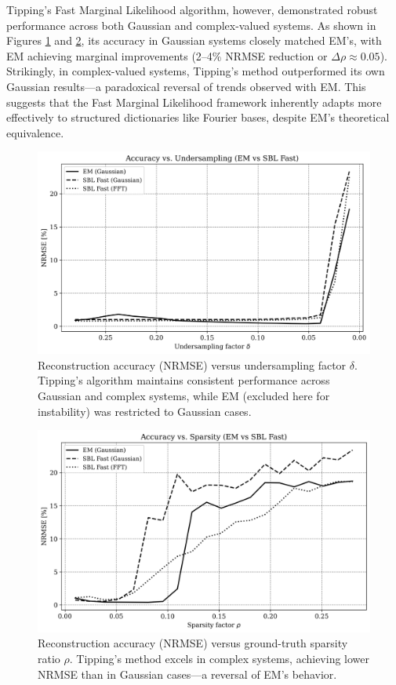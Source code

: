 \documentclass{article}
\begin{document}
Tipping’s Fast Marginal Likelihood algorithm, however, demonstrated robust performance across both Gaussian and complex-valued systems. As shown in Figures \ref{fig:accuracy_vs_undersampling_EMSB} and \ref{fig:accuracy_vs_sparsity_EMSB}, its accuracy in Gaussian systems closely matched EM’s, with EM achieving marginal improvements (2–4\% NRMSE reduction or $\Delta\rho\approx 0.05$). Strikingly, in complex-valued systems, Tipping’s method outperformed its own Gaussian results—a paradoxical reversal of trends observed with EM. This suggests that the Fast Marginal Likelihood framework inherently adapts more effectively to structured dictionaries like Fourier bases, despite EM’s theoretical equivalence.
\begin{figure}[H]
    \centering
    \includegraphics[width=0.75\linewidth]{Figures/accuracy_vs_undersampling_EMvsSB_woEMFFT.png}
    \caption{Reconstruction accuracy (NRMSE) versus undersampling factor $\delta$. Tipping’s algorithm maintains consistent performance across Gaussian and complex systems, while EM (excluded here for instability) was restricted to Gaussian cases.}
    \label{fig:accuracy_vs_undersampling_EMSB}
\end{figure}

\begin{figure}[H]
    \centering
    \includegraphics[width=0.75\linewidth]{Figures/accuracy_vs_sparsity_EMvsSB_woEMFFT.png}
    \caption{Reconstruction accuracy (NRMSE) versus ground-truth sparsity ratio $\rho$. Tipping’s method excels in complex systems, achieving lower NRMSE than in Gaussian cases—a reversal of EM’s behavior.}
    \label{fig:accuracy_vs_sparsity_EMSB}
\end{figure}
\end{document}
